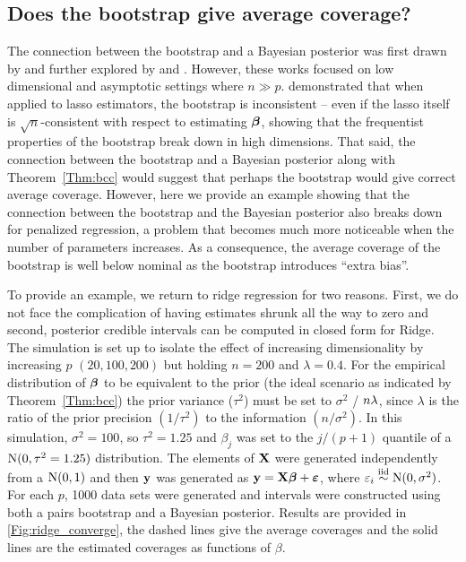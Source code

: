 \subsection{Does the bootstrap give average coverage?}
\label{Sec:boot-bias}

The connection between the bootstrap and a Bayesian posterior was first drawn by \cite{Rubin1981} and further explored by \cite{efron1982} and \cite{Lo1987}. However, these works focused on low dimensional and asymptotic settings where $n \gg p$. \cite{Chatterjee2010} demonstrated that when applied to lasso estimators, the bootstrap is inconsistent -- even if the lasso itself is $\sqrt{n}$-consistent with respect to estimating $\boldsymbol{\beta}$, showing that the frequentist properties of the bootstrap break down in high dimensions. That said, the connection between the bootstrap and a Bayesian posterior along with Theorem~\ref{Thm:bcc} would suggest that perhaps the bootstrap would give correct average coverage. However, here we provide an example showing that the connection between the bootstrap and the Bayesian posterior also breaks down for penalized regression, a problem that becomes much more noticeable when the number of parameters increases. As a consequence, the average coverage of the bootstrap is well below nominal as the bootstrap introduces ``extra bias''.

To provide an example, we return to ridge regression for two reasons. First, we do not face the complication of having estimates shrunk all the way to zero and second, posterior credible intervals can be computed in closed form for Ridge. The simulation is set up to isolate the effect of increasing dimensionality by increasing $p$ $(20, 100, 200)$ but holding $n = 200$ and $\lambda = 0.4$. For the empirical distribution of $\boldsymbol{\beta}$ to be equivalent to the prior (the ideal scenario as indicated by Theorem~\ref{Thm:bcc}) the prior variance ($\tau^2$) must be set to $\sigma^2$ / $n\lambda$, since $\lambda$ is the ratio of the prior precision $(1/\tau^2)$ to the information $(n / \sigma^2)$. In this simulation, $\sigma^2 = 100$, so $\tau^2 = 1.25$ and $\beta_j$ was set to the $j/(p+1)$ quantile of a $\textrm{N}(0,\tau^2=1.25)$ distribution. The elements of $\mathbf{X}$ were generated independently from a $\textrm{N}(0, 1)$ and then $\mathbf{y}$ was generated as $\mathbf{y} = \mathbf{X}\boldsymbol{\beta} + \boldsymbol{\varepsilon}$, where $\varepsilon_i \overset{\text{iid}}{\sim} \textrm{N}(0, \sigma^2)$. For each $p$, 1000 data sets were generated and intervals were constructed using both a pairs bootstrap and a Bayesian posterior. Results are provided in \ref{Fig:ridge_converge}, the dashed lines give the average coverages and the solid lines are the estimated coverages as functions of $\beta$.

